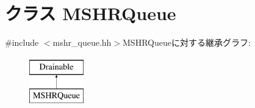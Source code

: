 \hypertarget{classMSHRQueue}{
\section{クラス MSHRQueue}
\label{classMSHRQueue}
}


{\ttfamily \#include $<$mshr\_\-queue.hh$>$}MSHRQueueに対する継承グラフ:\begin{figure}[H]
\begin{center}
\leavevmode
\includegraphics[height=2cm]{classMSHRQueue}
\end{center}
\end{figure}

